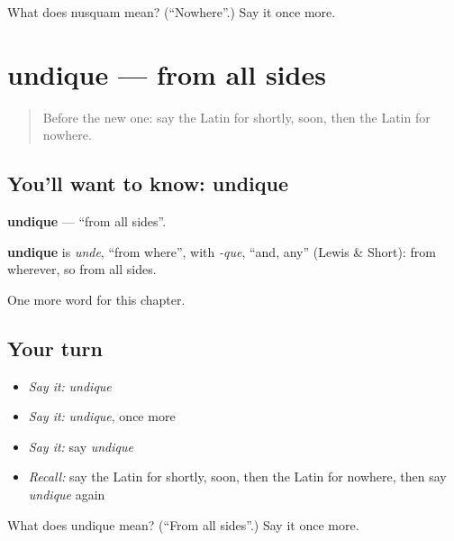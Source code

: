 \begin{tcolorbox}[breakable,colback=teal!4,colframe=teal!35!black,title={Before you move on}]
What does nusquam mean? (\textquotedblleft{}Nowhere\textquotedblright{}.) Say it once more.
\end{tcolorbox}
\section[undique]{undique — from all sides}

\label{lesson:LA-C264-undique}



\begin{quote}
Before the new one: say the Latin for shortly, soon, then the Latin for nowhere.
\end{quote}

\subsection*{You'll want to know: undique}
\textbf{undique} — \textquotedblleft{}from all sides\textquotedblright{}.

\begin{cousinweb}
\textbf{undique} is \emph{unde}, \textquotedblleft{}from where\textquotedblright{}, with \emph{-que}, \textquotedblleft{}and, any\textquotedblright{} (Lewis \& Short): from wherever, so from all sides.
\end{cousinweb}

\begin{grammarlens}[title={What you've built}]
One more word for this chapter.
\end{grammarlens}

\subsection*{Your turn}
\begin{itemize}
\raggedright
  \item \emph{Say it:} \emph{undique}
  \item \emph{Say it:} \emph{undique}, once more
  \item \emph{Say it:} say \emph{undique}
  \item \emph{Recall:} say the Latin for shortly, soon, then the Latin for nowhere, then say \emph{undique} again
\end{itemize}

\begin{tcolorbox}[breakable,colback=teal!4,colframe=teal!35!black,title={Before you move on}]
What does undique mean? (\textquotedblleft{}From all sides\textquotedblright{}.) Say it once more.
\end{tcolorbox}
